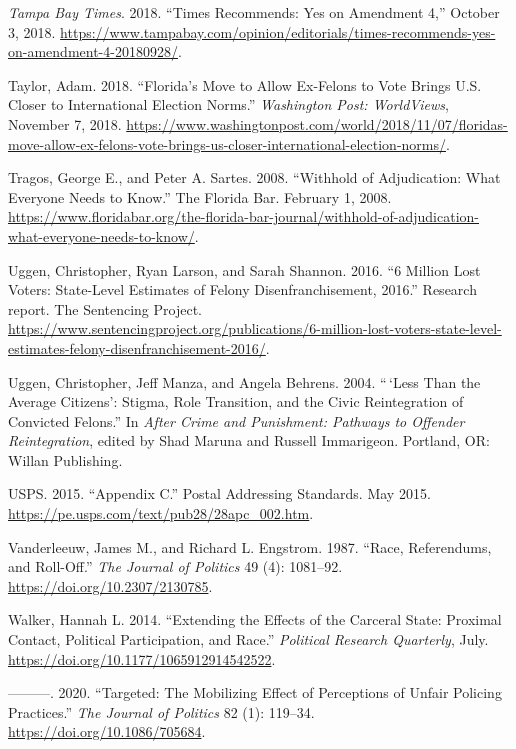 \documentclass[
  12pt,
]{article}
\newlength{\cslhangindent}
\newenvironment{cslreferences}%
  {\setlength{\parindent}{0pt}%
  \everypar{\setlength{\hangindent}{\cslhangindent}}\ignorespaces}%
  {\par}
\begin{document}
\begin{cslreferences}
\leavevmode\hypertarget{ref-tampabaytimes2018}{}%
\emph{Tampa Bay Times}. 2018. ``Times Recommends: Yes on Amendment 4,'' October 3, 2018. \url{https://www.tampabay.com/opinion/editorials/times-recommends-yes-on-amendment-4-20180928/}.

\leavevmode\hypertarget{ref-Taylor2018}{}%
Taylor, Adam. 2018. ``Florida's Move to Allow Ex-Felons to Vote Brings U.S. Closer to International Election Norms.'' \emph{Washington Post: WorldViews}, November 7, 2018. \url{https://www.washingtonpost.com/world/2018/11/07/floridas-move-allow-ex-felons-vote-brings-us-closer-international-election-norms/}.

\leavevmode\hypertarget{ref-Tragos2008}{}%
Tragos, George E., and Peter A. Sartes. 2008. ``Withhold of Adjudication: What Everyone Needs to Know.'' The Florida Bar. February 1, 2008. \url{https://www.floridabar.org/the-florida-bar-journal/withhold-of-adjudication-what-everyone-needs-to-know/}.

\leavevmode\hypertarget{ref-sentencing_2016}{}%
Uggen, Christopher, Ryan Larson, and Sarah Shannon. 2016. ``6 Million Lost Voters: State-Level Estimates of Felony Disenfranchisement, 2016.'' Research report. The Sentencing Project. \url{https://www.sentencingproject.org/publications/6-million-lost-voters-state-level-estimates-felony-disenfranchisement-2016/}.

\leavevmode\hypertarget{ref-Uggen2004a}{}%
Uggen, Christopher, Jeff Manza, and Angela Behrens. 2004. ``\,`Less Than the Average Citizens': Stigma, Role Transition, and the Civic Reintegration of Convicted Felons.'' In \emph{After Crime and Punishment: Pathways to Offender Reintegration}, edited by Shad Maruna and Russell Immarigeon. Portland, OR: Willan Publishing.

\leavevmode\hypertarget{ref-USPS2015}{}%
USPS. 2015. ``Appendix C.'' Postal Addressing Standards. May 2015. \url{https://pe.usps.com/text/pub28/28apc_002.htm}.

\leavevmode\hypertarget{ref-Vanderleeuw1987}{}%
Vanderleeuw, James M., and Richard L. Engstrom. 1987. ``Race, Referendums, and Roll-Off.'' \emph{The Journal of Politics} 49 (4): 1081--92. \url{https://doi.org/10.2307/2130785}.

\leavevmode\hypertarget{ref-Walker2014}{}%
Walker, Hannah L. 2014. ``Extending the Effects of the Carceral State: Proximal Contact, Political Participation, and Race.'' \emph{Political Research Quarterly}, July. \url{https://doi.org/10.1177/1065912914542522}.

\leavevmode\hypertarget{ref-Walker2020}{}%
---------. 2020. ``Targeted: The Mobilizing Effect of Perceptions of Unfair Policing Practices.'' \emph{The Journal of Politics} 82 (1): 119--34. \url{https://doi.org/10.1086/705684}.


\end{cslreferences}
\end{document}
